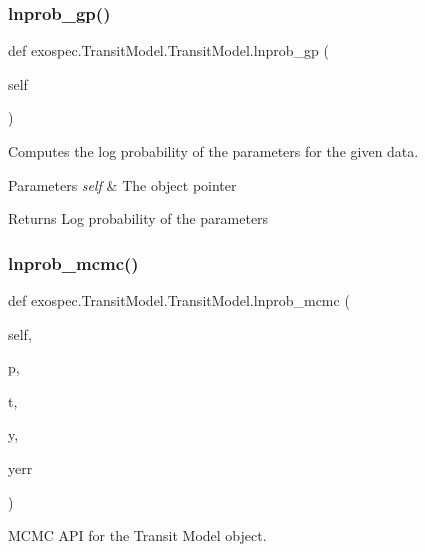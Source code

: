 \subsubsection{\texorpdfstring{lnprob\+\_\+gp()}{lnprob\_gp()}}
{\footnotesize\ttfamily def exospec.\+Transit\+Model.\+Transit\+Model.\+lnprob\+\_\+gp (\begin{DoxyParamCaption}\item[{}]{self }\end{DoxyParamCaption})}



Computes the log probability of the parameters for the given data. 


\begin{DoxyParams}{Parameters}
{\em self} & The object pointer \\
\hline
\end{DoxyParams}
\begin{DoxyReturn}{Returns}
Log probability of the parameters 
\end{DoxyReturn}
\mbox{\label{classexospec_1_1_transit_model_1_1_transit_model_a11a124a9e7257c0faa6a3577454fa670}} 
\subsubsection{\texorpdfstring{lnprob\+\_\+mcmc()}{lnprob\_mcmc()}}
{\footnotesize\ttfamily def exospec.\+Transit\+Model.\+Transit\+Model.\+lnprob\+\_\+mcmc (\begin{DoxyParamCaption}\item[{}]{self,  }\item[{}]{p,  }\item[{}]{t,  }\item[{}]{y,  }\item[{}]{yerr }\end{DoxyParamCaption})}



M\+C\+MC A\+PI for the Transit Model object. 


